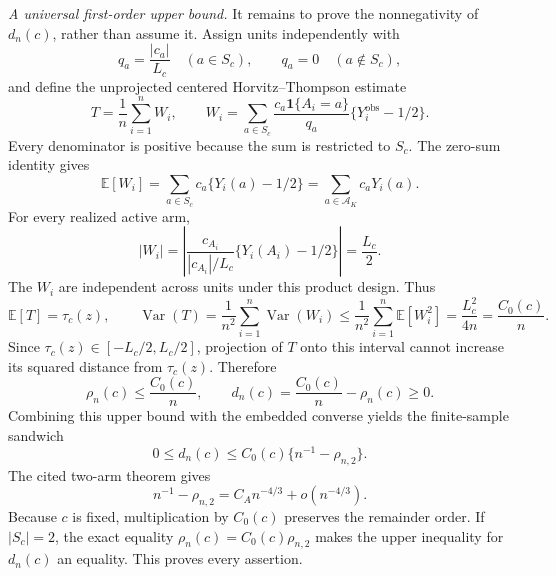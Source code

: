 \emph{A universal first-order upper bound.}
It remains to prove the nonnegativity of \(d_n(c)\), rather than assume it. Assign units independently with
\[
q_a=\frac{|c_a|}{L_c}\quad(a\in S_c),
\qquad q_a=0\quad(a\notin S_c),
\]
and define the unprojected centered Horvitz--Thompson estimate
\[
T=\frac1n\sum_{i=1}^n W_i,
\qquad
W_i=\sum_{a\in S_c}
\frac{c_a\mathbf1\{A_i=a\}}{q_a}
\{Y_i^{\mathrm{obs}}-1/2\}.
\]
Every denominator is positive because the sum is restricted to \(S_c\). The zero-sum identity gives
\[
\mathbb E[W_i]
=\sum_{a\in S_c}c_a\{Y_i(a)-1/2\}
=\sum_{a\in\mathcal A_K}c_aY_i(a).
\]
For every realized active arm,
\[
|W_i|=
\left|\frac{c_{A_i}}{|c_{A_i}|/L_c}
\{Y_i(A_i)-1/2\}\right|=\frac{L_c}{2}.
\]
The \(W_i\) are independent across units under this product design. Thus
\[
\mathbb E[T]=\tau_c(z),
\qquad
\operatorname{Var}(T)
=\frac1{n^2}\sum_{i=1}^n\operatorname{Var}(W_i)
\le\frac1{n^2}\sum_{i=1}^n\mathbb E[W_i^2]
=\frac{L_c^2}{4n}=\frac{C_0(c)}n.
\]
Since \(\tau_c(z)\in[-L_c/2,L_c/2]\), projection of \(T\) onto this interval cannot increase its squared distance from \(\tau_c(z)\). Therefore
\[
\rho_n(c)\le\frac{C_0(c)}n,
\qquad d_n(c)=\frac{C_0(c)}n-\rho_n(c)\ge0.
\]
Combining this upper bound with the embedded converse yields the finite-sample sandwich
\[
0\le d_n(c)
\le C_0(c)\{n^{-1}-\rho_{n,2}\}.
\]
The cited two-arm theorem gives
\[
n^{-1}-\rho_{n,2}=C_A n^{-4/3}+o(n^{-4/3}).
\]
Because \(c\) is fixed, multiplication by \(C_0(c)\) preserves the remainder order. If \(|S_c|=2\), the exact equality \(\rho_n(c)=C_0(c)\rho_{n,2}\) makes the upper inequality for \(d_n(c)\) an equality. This proves every assertion.
